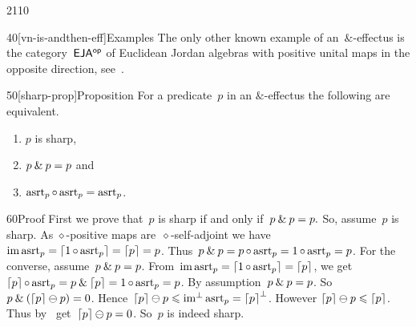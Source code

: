 \begin{parsec}{2110}
\begin{point}{40}[vn-is-andthen-eff]{Examples}
The only other known example of an~$\&$-effectus
    is the category~${\mathsf{EJA}}{^{\mathsf{op}}}$ of Euclidean Jordan algebras
    with positive unital maps in the opposite direction,
    see~\cite{eja}.
\end{point}
\begin{point}{50}[sharp-prop]{Proposition}%
For a predicate~$p$ in an $\&$-effectus the following are equivalent.
\begin{enumerate}
\item $p$ is sharp,
\item $p \mathbin{\&} p=p$ and
\item $\mathrm{asrt}_p \mathop{\circ} \mathrm{asrt}_p = \mathrm{asrt}_p$.
\end{enumerate}
\spacingfix{}
\begin{point}{60}{Proof}%
First we prove that~$p$ is sharp if and only if~$p \mathbin{\&} p=p.$
So, assume~$p$ is sharp.
As $\diamond$-positive maps are~$\diamond$-self-adjoint
    we have~$\operatorname{im} \mathrm{asrt}_p = \left\lceil1 \mathop{\circ} \mathrm{asrt}_p\right\rceil = \left\lceil p\right\rceil = p$.
Thus~$p \mathbin{\&} p = p \mathop{\circ} \mathrm{asrt}_p = 1 \mathop{\circ} \mathrm{asrt}_p = p$.
For the converse, assume~$p \mathbin{\&} p=p$.
From~$\operatorname{im} \mathrm{asrt}_p = \left\lceil1 \mathop{\circ} \mathrm{asrt}_p\right\rceil = \left\lceil p\right\rceil$,
we get~$\left\lceil p\right\rceil \mathop{\circ} \mathrm{asrt}_p = p \mathbin{\&} \left\lceil p\right\rceil = 1 \mathop{\circ} \mathrm{asrt}_p = p$.
By assumption~$p \mathbin{\&} p=p$.
So~$p \mathbin{\&} (\left\lceil p\right\rceil \ominus p) = 0$.
Hence~$\left\lceil p\right\rceil\ominus p \leqslant \operatorname{im^\perp} \mathrm{asrt}_p = \left\lceil p\right\rceil^\perp$.
However $\left\lceil p\right\rceil\ominus p \leqslant \left\lceil p\right\rceil$.
Thus by~
    get~$\left\lceil p\right\rceil \ominus p = 0$. So~$p$ is indeed sharp.


\end{point}
\end{point}
\end{parsec}
